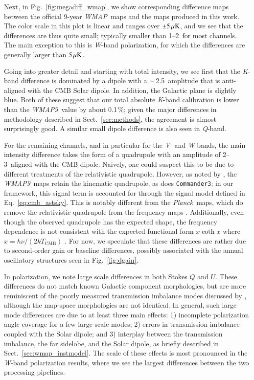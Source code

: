 \documentclass[twocolumn]{../../common/aa}
\def\WMAP{\emph{WMAP}}
\def\WMAPnine{\emph{WMAP9}}
\def\Planck{\emph{Planck}}
\def\commanderthree{\texttt{Commander3}}
\newcommand{\K}[0]{\textit K}
\newcommand{\Q}[0]{\textit Q}
\newcommand{\V}[0]{\textit V}
\newcommand{\W}[0]{\textit W}
\begin{document}
Next, in Fig.~\ref{fig:megadiff_wmap}, we show corresponding difference maps between the official 9-year \WMAP\ maps and the maps produced in this work. The color scale in this plot is linear and ranges over $\pm5\muK$, and we see that the differences are thus quite small; typically smaller than 1--2\muK\ for most channels. The main exception to this is \W-band polarization, for which the differences are generally larger than $5\muK$.

Going into greater detail and starting with total intensity, we see first that the \K-band difference is dominated by a dipole with a $\sim$\,2.5\muK\ amplitude that is anti-aligned with the CMB Solar dipole. In addition, the Galactic plane is slightly blue. Both of these suggest that our total absolute \K-band calibration is lower than the \WMAPnine\ value by about 0.1\,\%; given the major differences in methodology described in Sect.~\ref{sec:methods}, the agreement is almost surprisingly good. A similar small dipole difference is also seen in \Q-band.

For the remaining channels, and in particular for the \V- and \W-bands, the main intensity difference takes the form of a quadrupole with an amplitude of 2--3\muK\ aligned with the CMB dipole. Naively, one could suspect this to be due to different treatments of the relativistic quadrupole. However, as noted by \citet{larson2014}, the \WMAPnine\ maps retain the kinematic quadrupole, as does \commanderthree; in our framework, this signal term is accounted for through the signal model defined in Eq.~\eqref{eq:cmb_astsky}. This is notably different from the \Planck\ maps, which do remove the relativistic quadrupole from the frequency maps \citep{planck2016-l02,planck2016-l03}. Additionally, even though the observed quadrupole has the expected shape, the frequency dependence is not consistent with the expected functional form $x\coth x$ where $x=h\nu/(2kT_\mathrm{CMB})$ \citep{Notari:2015}. For now, we speculate that these differences are rather due to second-order gain or baseline differences, possibly associated with the annual oscillatory structures seen in Fig.~\ref{fig:dgain}.

In polarization, we note large scale differences in both Stokes $Q$ and $U$. These differences do not match known Galactic component morphologies, but are more reminiscent of the poorly measured transmission imbalance modes discussed by \citet{jarosik2010}, although the map-space morphologies are not identical. In general, such large mode differences are due to at least three main effects: 1) incomplete polarization angle coverage for a few large-scale modes; 2) errors in transmission imbalance coupled with the Solar dipole; and 3) interplay between the transmission imbalance, the far sidelobe, and the Solar dipole, as briefly described in Sect.~\ref{sec:wmap_instmodel}. The scale of these effects is most pronounced in the \W-band polarization results, where we see the largest differences between the two processing pipelines.
\end{document}
